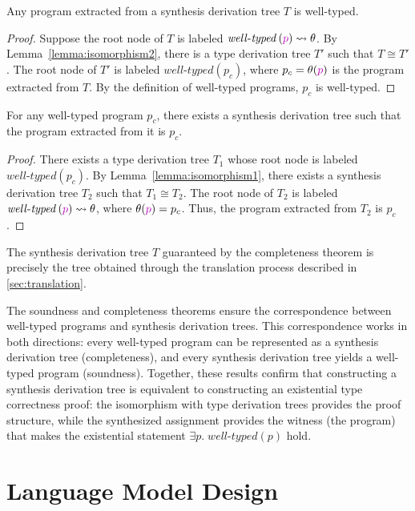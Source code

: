 \documentclass[manuscript,screen]{acmart}
\newcommand{\sk}[1]{\textcolor{skunknown}{#1}}
\newcommand{\welltyped}[1]{\mathit{well\text{-}typed}\left(#1\right)}
\begin{document}
\begin{theorem}[Soundness]
Any program extracted from a synthesis derivation tree $T$ is well-typed.
\end{theorem}
\begin{proof}
Suppose the root node of $T$ is labeled $\welltyped{\sk{p}} \leadsto \theta$. By Lemma~\ref{lemma:isomorphism2}, there is a type derivation tree $T'$ such that $T \cong T'$. The root node of $T'$ is labeled $\welltyped{p_c}$, where $p_c = \theta(\sk{p})$ is the program extracted from $T$. By the definition of well-typed programs, $p_c$ is well-typed.
\end{proof}

\begin{theorem}[Completeness]
For any well-typed program $p_c$, there exists a synthesis derivation tree such that the program extracted from it is $p_c$.
\end{theorem}
\begin{proof}
There exists a type derivation tree $T_1$ whose root node is labeled $\welltyped{p_c}$. By Lemma~\ref{lemma:isomorphism1}, there exists a synthesis derivation tree $T_2$ such that $T_1 \cong T_2$. The root node of $T_2$ is labeled $\welltyped{\sk{p}} \leadsto \theta$, where $\theta(\sk{p}) = p_c$. Thus, the program extracted from $T_2$ is $p_c$.
\end{proof}

\begin{corollary}
The synthesis derivation tree $T$ guaranteed by the completeness theorem is precisely the tree obtained through the translation process described in \autoref{sec:translation}.
\end{corollary}

The soundness and completeness theorems ensure the correspondence between well-typed programs and synthesis derivation trees. This correspondence works in both directions: every well-typed program can be represented as a synthesis derivation tree (completeness), and every synthesis derivation tree yields a well-typed program (soundness). Together, these results confirm that constructing a synthesis derivation tree is equivalent to constructing an existential type correctness proof: the isomorphism with type derivation trees provides the proof structure, while the synthesized assignment provides the witness (the program) that makes the existential statement $\exists p.\; \welltyped{p}$ hold.
\section{Language Model Design}
\label{sec:implementation}
\end{document}
